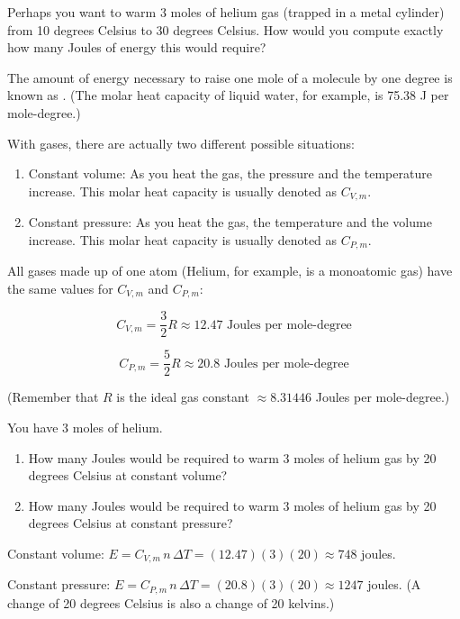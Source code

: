 Perhaps you want to warm 3 moles of helium gas (trapped in a metal cylinder) from 10 degrees Celsius to 30 degrees Celsius.  
How would you compute exactly how many Joules of energy this would require?

The amount of energy necessary to raise one mole of a molecule by one degree is known as . 
(The molar heat capacity of liquid water, for example, is 75.38 J per mole-degree.)

With gases, there are actually two different possible situations:
\begin{enumerate}
\item Constant volume: As you heat the gas, the pressure and the temperature increase. This molar heat capacity is usually denoted as $C_{V,m}$. 
\item Constant pressure: As you heat the gas, the temperature and the volume increase. This molar heat capacity is usually denoted as $C_{P, m}$.
\end{enumerate}

All gases made up of one atom (Helium, for example, is a monoatomic gas) have the same values for $C_{V,m}$ and $C_{P,m}$:

$$C_{V,m} = \frac{3}{2}R \approx 12.47 \text{ Joules per mole-degree}$$

$$C_{P,m} = \frac{5}{2}R \approx 20.8 \text{ Joules per mole-degree}$$

(Remember that $R$ is the ideal gas constant $\approx 8.31446$ Joules per mole-degree.)

\begin{Exercise}[title={Warming Helium}, label=warming_helium]

You have 3 moles of helium. 
 
\begin{enumerate}

\item How many Joules would be required to warm 3 moles of helium gas by 20 degrees Celsius at constant volume? 

\item How many Joules would be required to warm 3 moles of helium gas by 20 degrees Celsius at constant pressure? 

\end{enumerate}


\end{Exercise}
\begin{Answer}[ref=warming_helium]

Constant volume: $E = C_{V,m} \, n \, \Delta T = (12.47)(3)(20) \approx 748$ joules.



Constant pressure: $E = C_{P,m} \, n \, \Delta T = (20.8)(3)(20) \approx 1247$ joules. (A change of 20 degrees Celsius is also a change of 20 kelvins.)
\end{Answer}

